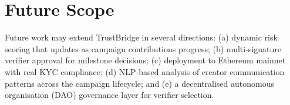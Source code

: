 \section{Future Scope}

Future work may extend TrustBridge in several directions: (a) dynamic risk scoring that updates as campaign contributions progress; (b) multi-signature verifier approval for milestone decisions; (c) deployment to Ethereum mainnet with real KYC compliance; (d) NLP-based analysis of creator communication patterns across the campaign lifecycle; and (e) a decentralised autonomous organisation (DAO) governance layer for verifier selection.
